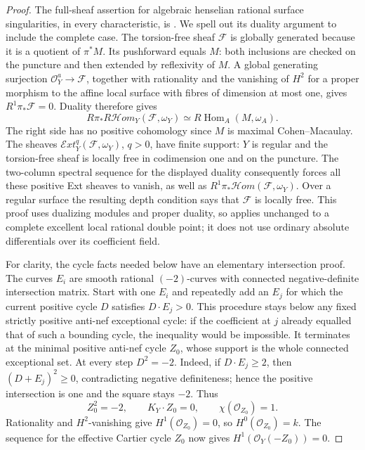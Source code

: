\begin{proof}
The full-sheaf assertion for algebraic henselian rational surface
singularities, in every characteristic, is
\citet[Section 2.1 and Proposition 2.7 with its full proof,
pp.~4 and 7--8 of the author version]{C_GustavsenIle2018}.
We spell out its duality argument to include the complete case.
The torsion-free sheaf $\mathcal F$ is globally generated because it is
a quotient of $\pi^*M$. Its pushforward equals $M$: both inclusions are
checked on the puncture and then extended by reflexivity of $M$.
A global generating surjection $\mathcal O_Y^a\to\mathcal F$, together
with rationality and the vanishing of $H^2$ for a proper morphism to the
affine local surface with fibres of dimension at most one, gives
$R^1\pi_*\mathcal F=0$. Duality therefore gives
\[
 R\pi_*R\mathcal Hom_Y(\mathcal F,\omega_Y)
       \simeq R\operatorname{Hom}_A(M,\omega_A).
\]
The right side has no positive cohomology since $M$ is maximal
Cohen--Macaulay. The sheaves
$\mathcal Ext_Y^q(\mathcal F,\omega_Y)$, $q>0$, have finite support:
$Y$ is regular and the torsion-free sheaf is locally free in codimension
one and on the puncture. The two-column spectral sequence for the
displayed duality consequently forces all these positive Ext sheaves
to vanish, as well as $R^1\pi_*\mathcal Hom(\mathcal F,\omega_Y)$.
Over a regular surface the resulting depth condition says that
$\mathcal F$ is locally free. This proof uses dualizing modules and
proper duality, so applies unchanged to a complete excellent local
rational double point; it does not use ordinary absolute differentials
over its coefficient field.

For clarity, the cycle facts needed below have an elementary
intersection proof. The curves $E_i$ are smooth rational $(-2)$-curves
with connected negative-definite intersection matrix. Start with one
$E_i$ and repeatedly add an $E_j$ for which the current positive cycle
$D$ satisfies $D\cdot E_j>0$. This procedure stays below any fixed
strictly positive anti-nef exceptional cycle: if the coefficient at $j$
already equalled that of such a bounding cycle, the inequality would
be impossible. It terminates at the minimal positive anti-nef cycle
$Z_0$, whose support is the whole connected exceptional set.
At every step $D^2=-2$. Indeed, if $D\cdot E_j\ge2$, then
$(D+E_j)^2\ge0$, contradicting negative definiteness; hence the positive
intersection is one and the square stays $-2$. Thus
\[
 Z_0^2=-2,\qquad K_Y\cdot Z_0=0,
 \qquad\chi(\mathcal O_{Z_0})=1.                       \tag{D.FS.3}
\]
Rationality and $H^2$-vanishing give
$H^1(\mathcal O_{Z_0})=0$, so $H^0(\mathcal O_{Z_0})=k$.
The sequence for the effective Cartier cycle $Z_0$ now gives
$H^1(\mathcal O_Y(-Z_0))=0$.


\end{proof}
